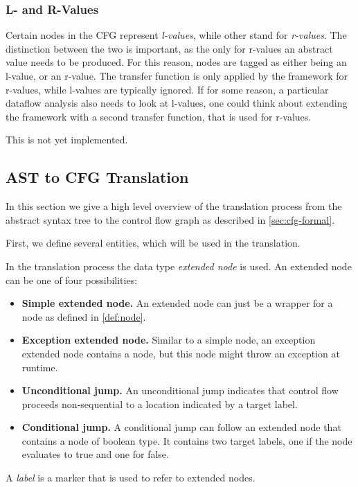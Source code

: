 \begin{new}
\subsubsection{L- and R-Values}

Certain nodes in the CFG represent \emph{l-values}, while other stand for \emph{r-values}.  The
distinction between the two is important, as the only for r-values an abstract value needs to be
produced.  For this reason, nodes are tagged as either being an l-value, or an r-value.  The transfer function
is only applied by the framework for r-values, while l-values are typically ignored.  If for some
reason, a particular dataflow analysis also needs to look at l-values, one could think about
extending the framework with a second transfer function, that is used for r-values.

\begin{workinprogress}
    This is not yet implemented.
\end{workinprogress}

\end{new}




\subsection{AST to CFG Translation}

In this section we give a high level overview of the translation process from the
abstract syntax tree to the control flow graph as described in \autoref{sec:cfg-formal}.

First, we define several entities, which will be used in the translation.

\begin{definition}
    In the translation process the data type \emph{extended node} is used.
    An extended node can be one of four possibilities:
    \begin{itemize}
        \item \textbf{Simple extended node.} An extended node can just be a wrapper for a node
        as defined in \autoref{def:node}.
        \item \textbf{Exception extended node.} Similar to a simple node, an exception extended
        node contains a node, but this node might throw an exception at runtime.
        \item \textbf{Unconditional jump.} An unconditional jump indicates that control
        flow proceeds non-sequential to a location indicated by a target label.
        \item \textbf{Conditional jump.} A conditional jump can follow an extended node
        that contains a node of boolean type. It contains two target labels, one if the
        node evaluates to true and one for false.
    \end{itemize}
\end{definition}
\begin{definition}[Label]
    A \emph{label} is a marker that is used to refer to extended nodes.
\end{definition}

